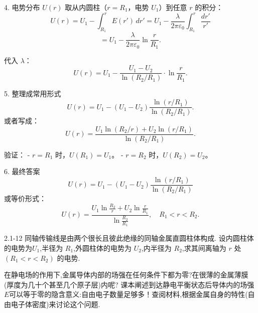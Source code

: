 \documentclass{article}
\begin{document}
 4. 电势分布 $ U(r) $
取从内圆柱（$ r = R_1 $，电势 $ U_1 $）到任意 $ r $ 的积分：
$$
U(r) = U_1 - \int_{R_1}^{r} E(r') \, dr'
= U_1 - \frac{\lambda}{2\pi\varepsilon_0} \int_{R_1}^{r} \frac{dr'}{r'}
$$
$$
= U_1 - \frac{\lambda}{2\pi\varepsilon_0} \ln\frac{r}{R_1}.
$$

代入 $\lambda$：
$$
U(r) = U_1 - \frac{U_1 - U_2}{\ln(R_2/R_1)} \cdot \ln\frac{r}{R_1}.
$$



 5. 整理成常用形式
$$
U(r) = U_1 - (U_1 - U_2) \frac{\ln(r/R_1)}{\ln(R_2/R_1)}.
$$
或者写成：
$$
U(r) = \frac{U_1 \ln(R_2/r) + U_2 \ln(r/R_1)}{\ln(R_2/R_1)}.
$$

验证：  
- $ r = R_1 $ 时，$ U(R_1) = U_1 $。
- $ r = R_2 $ 时，$ U(R_2) = U_2 $。



 6. 最终答案
$$
\boxed{U(r) = U_1 - (U_1 - U_2) \frac{\ln(r/R_1)}{\ln(R_2/R_1)}}
$$
或等价形式：
$$
U(r) = \frac{U_1 \ln\frac{R_2}{r} + U_2 \ln\frac{r}{R_1}}{\ln\frac{R_2}{R_1}}, \quad R_1 < r < R_2.
$$








\newpage

2.1-12 同轴传输线是由两个很长且彼此绝缘的同轴金属直圆柱体构成.
设内圆柱体的电势为$U_{1}$,半径为 $R_1$,外圆柱体的电势为 $U_2$,内半径为 $R_2$,求其间离轴为 $r$ 处$(R_1<r<R_2)$ 的电势.











\newpage

在静电场的作用下,金属导体内部的场强在任何条件下都为零?在很薄的金属薄膜(厚度为几十个甚至几个原子层)内呢?
课本阐述到达静电平衡状态后导体内的场强$E$可以等于零的隐含意义:自由电子数量足够多！查阅材料,根据金属自身的特性(自由电子体密度)来讨论这个问题.
\end{document}

